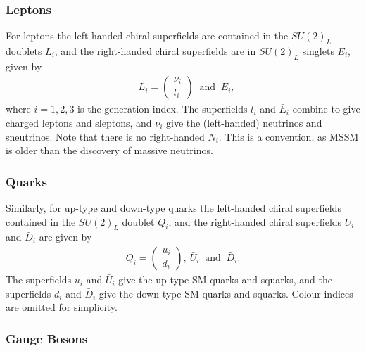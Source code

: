 \documentclass[twoside,english]{uiofysmaster}
\begin{document}
\subsubsection{Leptons}

For leptons the left-handed chiral superfields are contained in the $SU(2)_L$ doublets $L_i$, and the right-handed chiral superfields are in $SU(2)_L$ singlets $\bar{E}_i$,  given by 
\begin{align}
&L_i = \begin{pmatrix}
\nu_i\\
l_i
\end{pmatrix}
~\text{ and } ~
\bar{E}_i,
\end{align}
where $i=1,2,3$ is the generation index. The superfields $l_i$ and $\bar{E}_i$ combine to give charged leptons and sleptons, and $\nu_i$ give the (left-handed) neutrinos and sneutrinos. Note that there is no right-handed $\bar{N}_i$. This is a convention, as MSSM is older than the discovery of massive neutrinos. 

\subsubsection{Quarks}

Similarly, for up-type and down-type quarks the left-handed chiral superfields contained in the $SU(2)_L$ doublet $Q_i$,  and the right-handed chiral superfields $\bar{U}_i$ and $\bar{D}_i$  are given by
\begin{align}
Q_i = \begin{pmatrix}
u_i\\
d_i
\end{pmatrix},
~ \bar{U}_i ~ \text{ and }~ \bar{D}_i.
\end{align}
The superfields $u_i$ and $\bar{U}_i$ give the up-type SM quarks and squarks, and the superfields $d_i$ and $\bar{D}_i$ give the down-type SM quarks and squarks. Colour indices are omitted for simplicity.

\subsubsection{Gauge Bosons}
\end{document}
